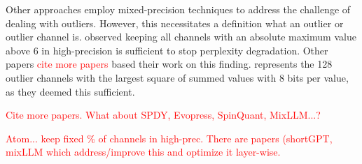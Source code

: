Other approaches employ mixed-precision techniques to address the challenge of dealing with outliers. However, this necessitates a definition what an outlier or outlier channel is. \cite{llmint8} observed keeping all channels with an absolute maximum value above 6 in high-precision is sufficient to stop perplexity degradation. Other papers \textcolor{red}{cite more papers} based their work on this finding.
\cite{atom} represents the 128 outlier channels with the largest square of summed values with 8 bits per value, as they deemed this sufficient. 

\textcolor{red}{Cite more papers. What about SPDY, Evopress, SpinQuant, MixLLM...?}

\textcolor{red}{Atom... keep fixed \% of channels in high-prec. There are papers (shortGPT, mixLLM which address/improve this and optimize it layer-wise.}